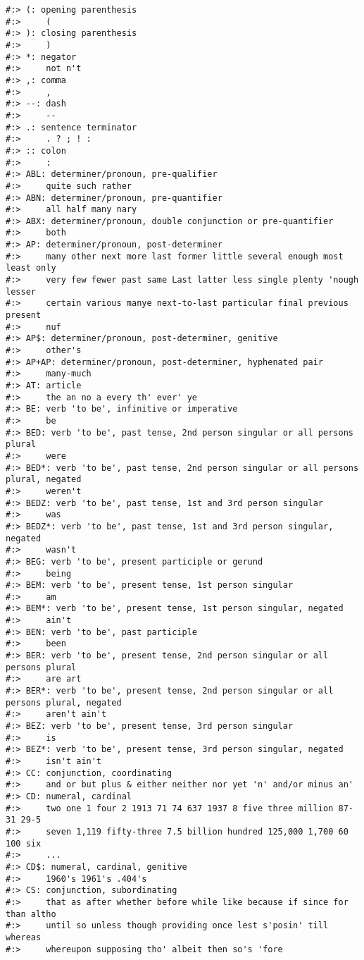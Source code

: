 \documentclass[
]{book}
\begin{document}
\begin{verbatim}
#:> (: opening parenthesis
#:>     (
#:> ): closing parenthesis
#:>     )
#:> *: negator
#:>     not n't
#:> ,: comma
#:>     ,
#:> --: dash
#:>     --
#:> .: sentence terminator
#:>     . ? ; ! :
#:> :: colon
#:>     :
#:> ABL: determiner/pronoun, pre-qualifier
#:>     quite such rather
#:> ABN: determiner/pronoun, pre-quantifier
#:>     all half many nary
#:> ABX: determiner/pronoun, double conjunction or pre-quantifier
#:>     both
#:> AP: determiner/pronoun, post-determiner
#:>     many other next more last former little several enough most least only
#:>     very few fewer past same Last latter less single plenty 'nough lesser
#:>     certain various manye next-to-last particular final previous present
#:>     nuf
#:> AP$: determiner/pronoun, post-determiner, genitive
#:>     other's
#:> AP+AP: determiner/pronoun, post-determiner, hyphenated pair
#:>     many-much
#:> AT: article
#:>     the an no a every th' ever' ye
#:> BE: verb 'to be', infinitive or imperative
#:>     be
#:> BED: verb 'to be', past tense, 2nd person singular or all persons plural
#:>     were
#:> BED*: verb 'to be', past tense, 2nd person singular or all persons plural, negated
#:>     weren't
#:> BEDZ: verb 'to be', past tense, 1st and 3rd person singular
#:>     was
#:> BEDZ*: verb 'to be', past tense, 1st and 3rd person singular, negated
#:>     wasn't
#:> BEG: verb 'to be', present participle or gerund
#:>     being
#:> BEM: verb 'to be', present tense, 1st person singular
#:>     am
#:> BEM*: verb 'to be', present tense, 1st person singular, negated
#:>     ain't
#:> BEN: verb 'to be', past participle
#:>     been
#:> BER: verb 'to be', present tense, 2nd person singular or all persons plural
#:>     are art
#:> BER*: verb 'to be', present tense, 2nd person singular or all persons plural, negated
#:>     aren't ain't
#:> BEZ: verb 'to be', present tense, 3rd person singular
#:>     is
#:> BEZ*: verb 'to be', present tense, 3rd person singular, negated
#:>     isn't ain't
#:> CC: conjunction, coordinating
#:>     and or but plus & either neither nor yet 'n' and/or minus an'
#:> CD: numeral, cardinal
#:>     two one 1 four 2 1913 71 74 637 1937 8 five three million 87-31 29-5
#:>     seven 1,119 fifty-three 7.5 billion hundred 125,000 1,700 60 100 six
#:>     ...
#:> CD$: numeral, cardinal, genitive
#:>     1960's 1961's .404's
#:> CS: conjunction, subordinating
#:>     that as after whether before while like because if since for than altho
#:>     until so unless though providing once lest s'posin' till whereas
#:>     whereupon supposing tho' albeit then so's 'fore

\end{verbatim}
\end{document}
